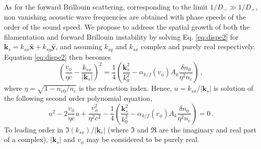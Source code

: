 \documentclass[
 reprint,
 amsmath,amssymb,
 aps,
]{revtex4-1}
\begin{document}
As for the forward Brillouin scattering,  corresponding to the limit $1/D_-\gg1/D_+$, non vanishing acoustic wave frequencies are obtained with  phase speeds of the order of the sound speed. We propose to address the spatial growth of both the filamentation and forward Brillouin instability  by solving Eq. \eqref{eq:dispe2} for  $\mathbf{k}_s = k_{sx} \hat{\mathbf{x}} +k_{sy} \hat{\mathbf{y}}$, and assuming 
$ k_{sy}$ and $k_{sx}$ complex and purely real   respectively. Equation \eqref{eq:dispe2} then becomes 
\begin{equation}\label{eq:dispe3} 
\left(\frac{v_\phi}{\eta c} - 
\frac{ k_{sx}}{\vert \mathbf{k}_s\vert }\right)^2
=\frac{1}{4} \left( \frac{\mathbf{k}_s^2}{k_0^2} - \alpha_{k/f}(v_\phi)A_k\frac{\delta n_0}{\eta^2n_c} \right) 
\, ,
\end{equation}
where $\eta=\sqrt{1-n_{e0}/n_c}$ is the refraction index.
Hence, $u =  k_{sx}/\vert \mathbf{k}_s\vert $ is solution of the following second order polynomial equation, 
\begin{equation}\label{eq:dispe2poly} 
u^2 -2\frac{v_\phi}{\eta c}u +\frac{v_\phi^2}{\eta^2 c^2}-\frac{1}{4}\left( \frac{\mathbf{k}_s^2}{k_0^2} - \alpha_{k/f}(v_\phi)A_k\frac{\delta n_0}{\eta^2n_c} \right) =0 
\, .
\end{equation}
To leading order in  $\Im(k_{sx})/\vert \mathbf{k}_s\vert $ (where $\Im$ and $\Re$ are the imaginary and real part of a complex), $\vert \mathbf{k}_s\vert$ and $v_\phi$ may be considered to be purely real.
\end{document}
